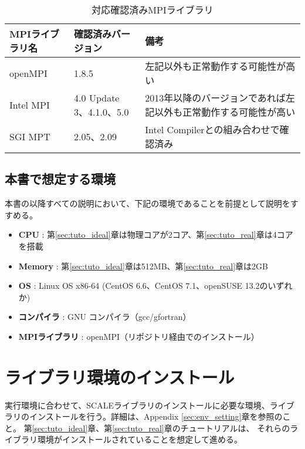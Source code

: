 \begin{table}[htb]
\begin{center}
\caption{対応確認済みMPIライブラリ}
\begin{tabularx}{150mm}{|l|l|X|} \hline
 \rowcolor[gray]{0.9} MPIライブラリ名 & 確認済みバージョン & 備考 \\ \hline
 openMPI   & 1.8.5                    & 左記以外も正常動作する可能性が高い \\ \hline
 Intel MPI & 4.0 Update 3、4.1.0、5.0 & 2013年以降のバージョンであれば左記以外も正常動作する可能性が高い \\ \hline
 SGI MPT   & 2.05、2.09               & Intel Compilerとの組み合わせで確認済み \\ \hline
\end{tabularx}
\label{tab:compatible_mpi}
\end{center}
\end{table}


\subsection{本書で想定する環境}
\label{sec:assumed_env}
本書の以降すべての説明において、下記の環境であることを前提として説明をすすめる。

\begin{itemize}
 \item {\bf CPU} : 第\ref{sec:tuto_ideal}章は物理コアが2コア、第\ref{sec:tuto_real}章は4コアを搭載
 \item {\bf Memory} : 第\ref{sec:tuto_ideal}章は512MB、第\ref{sec:tuto_real}章は2GB
 \item {\bf OS} : Linux OS x86-64 (CentOS 6.6、CentOS 7.1、openSUSE 13.2のいずれか)
 \item {\bf コンパイラ} : GNU コンパイラ（gcc/gfortran）
 \item {\bf MPIライブラリ} : openMPI（リポジトリ経由でのインストール）
\end{itemize}


\section{ライブラリ環境のインストール}
\label{sec:inst_env}
実行環境に合わせて、SCALEライブラリのインストールに必要な環境、ライブラリのインストールを行う。詳細は、Appendix \ref{sec:env_setting}章を参照のこと。
第\ref{sec:tuto_ideal}章、第\ref{sec:tuto_real}章のチュートリアルは、
それらのライブラリ環境がインストールされていることを想定して進める。

